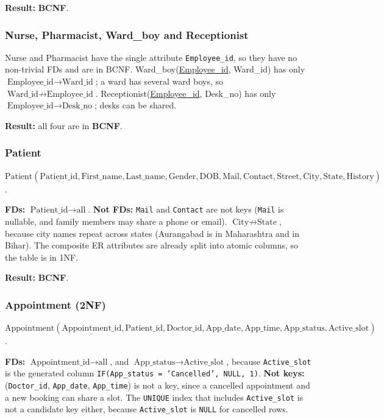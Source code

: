 \documentclass[11pt,a4paper]{article}
\newcommand{\code}[1]{\texttt{#1}}
\begin{document}
\textbf{Result:} \textbf{BCNF}.

\subsubsection*{Nurse, Pharmacist, Ward\_boy and Receptionist}
Nurse and Pharmacist have the single attribute \code{Employee\_id}, so they have no non-trivial FDs and are in BCNF. Ward\_boy(\underline{Employee\_id}, Ward\_id) has only $\text{Employee\_id} \rightarrow \text{Ward\_id}$; a ward has several ward boys, so $\text{Ward\_id} \nrightarrow \text{Employee\_id}$. Receptionist(\underline{Employee\_id}, Desk\_no) has only $\text{Employee\_id} \rightarrow \text{Desk\_no}$; desks can be shared.

\textbf{Result:} all four are in \textbf{BCNF}.

\subsubsection*{Patient}
$\text{Patient}(\underline{\text{Patient\_id}}, \text{First\_name}, \text{Last\_name}, \text{Gender}, \text{DOB}, \text{Mail}, \text{Contact}, \text{Street}, \text{City}, \text{State}, \text{History})$.

\textbf{FDs:} $\text{Patient\_id} \rightarrow \text{all}$.
\textbf{Not FDs:} \code{Mail} and \code{Contact} are not keys (\code{Mail} is nullable, and family members may share a phone or email). $\text{City} \nrightarrow \text{State}$, because city names repeat across states (Aurangabad is in Maharashtra and in Bihar). The composite ER attributes are already split into atomic columns, so the table is in 1NF.

\textbf{Result:} \textbf{BCNF}.

\subsubsection*{Appointment (2NF)}
$\text{Appointment}(\underline{\text{Appointment\_id}}, \text{Patient\_id}, \text{Doctor\_id}, \text{App\_date}, \text{App\_time}, \text{App\_status}, \text{Active\_slot})$.

\textbf{FDs:} $\text{Appointment\_id} \rightarrow \text{all}$, and $\text{App\_status} \rightarrow \text{Active\_slot}$, because \code{Active\_slot} is the generated column \code{IF(App\_status = 'Cancelled', NULL, 1)}.
\textbf{Not keys:} (\code{Doctor\_id}, \code{App\_date}, \code{App\_time}) is not a key, since a cancelled appointment and a new booking can share a slot. The \code{UNIQUE} index that includes \code{Active\_slot} is not a candidate key either, because \code{Active\_slot} is \code{NULL} for cancelled rows.
\end{document}
